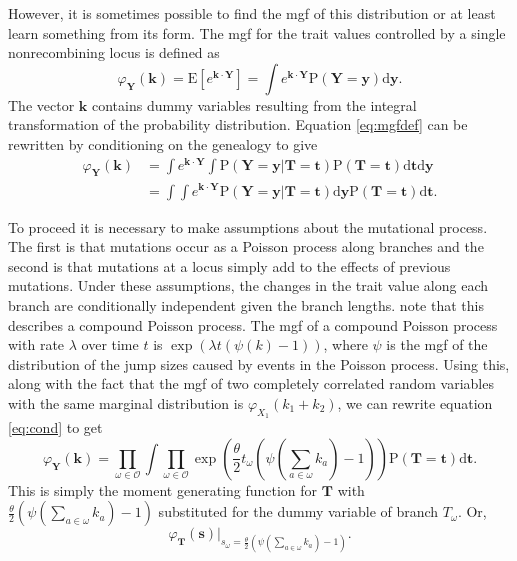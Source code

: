 \documentclass{article}
\newcommand{\E}{\mathrm{E}}
\newcommand{\Pro}{\mathrm{P}}
\begin{document}
However, it is sometimes possible to find the mgf of this distribution or at
least learn something from its form. The mgf for the trait values controlled by
a single nonrecombining locus is defined as
\begin{equation}
  \label{eq:mgfdef}
  \varphi_{\mathbf{Y}}(\mathbf{k}) = \E\left[ e^{\mathbf{k} \cdot \mathbf{Y}} \right] =
  \int e^{\mathbf{k} \cdot \mathbf{Y}} \Pro(\mathbf{Y}=\mathbf{y}) \mbox{d}\mathbf{y}.
\end{equation}
The vector $\mathbf{k}$ contains dummy variables resulting from the integral
transformation of the probability distribution. Equation \ref{eq:mgfdef} can be
rewritten by conditioning on the genealogy to give
\begin{align}
  \label{eq:cond}
  \varphi_{\mathbf{Y}}(\mathbf{k}) &= \int e^{\mathbf{k} \cdot \mathbf{Y}}
  \int \Pro(\mathbf{Y}=\mathbf{y} | \mathbf{T}=\mathbf{t}) \Pro(\mathbf{T}=\mathbf{t})
  \mbox{d}\mathbf{t} \mbox{d}\mathbf{y} \nonumber \\
  &= \int \int e^{\mathbf{k} \cdot \mathbf{Y}} \Pro(\mathbf{Y}=\mathbf{y} | \mathbf{T}=\mathbf{t}) \mbox{d}\mathbf{y}
  \Pro(\mathbf{T}=\mathbf{t})
  \mbox{d}\mathbf{t}.
\end{align}

To proceed it is necessary to make assumptions about the mutational process. The
first is that mutations occur as a Poisson process along branches and the second
is that mutations at a locus simply add to the effects of previous mutations.
Under these assumptions, the changes in the trait value along each branch are
conditionally independent given the branch lengths. \citet{Schraiber2015} note
that this describes a compound Poisson process. The mgf of a compound Poisson
process with rate $\lambda$ over time $t$ is $\exp(\lambda t (\psi(k)-1))$,
where $\psi$ is the mgf of the distribution of the jump sizes caused by events
in the Poisson process. Using this, along with the fact that the mgf of two
completely correlated random variables with the same marginal distribution is
$\varphi_{X_1}(k_1+k_2)$, we can rewrite equation \ref{eq:cond} to get
\begin{equation}
  \label{eq:fullmgf}
  \varphi_{\mathbf{Y}}(\mathbf{k}) = \prod_{\omega \in \mathcal{O}}
  \int \prod_{\omega \in \mathcal{O}} \exp\left( \frac{\theta}{2} t_{\omega} \left( \psi\left(\sum_{a \in \omega}k_{a}\right) -1 \right)\right)
  \Pro(\mathbf{T}=\mathbf{t})\mbox{d}\mathbf{t}.
\end{equation}
This is simply the moment generating function for $\mathbf{T}$ with
$\frac{\theta}{2} \left( \psi(\sum_{a \in \omega}k_{a}) -1 \right)$
substituted for the dummy variable of branch $T_{\omega}$. Or,
\begin{equation}
  \label{eq:sub}
  \varphi_{\mathbf{T}}(\mathbf{s})\Bigr|_{s_{\omega}=\frac{\theta}{2} \left( \psi\left(\sum_{a \in \omega}k_{a}\right) -1 \right)}.
\end{equation}
\end{document}
